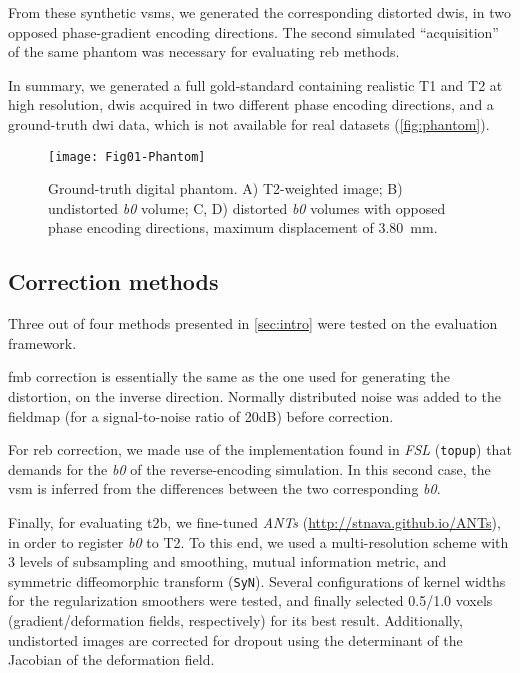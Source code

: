 From these synthetic \glspl*{vsm}, we generated
the corresponding distorted \glspl*{dwi}, in two opposed
phase-gradient encoding directions. The second simulated
``acquisition'' of the same phantom was necessary 
for evaluating \gls*{reb} methods.

In summary, we generated 
a full gold-standard containing realistic T1 and T2
at high resolution, \glspl*{dwi} acquired in two
different phase encoding directions, and a ground-truth
\gls*{dwi} data, which is not available for real datasets
(\autoref{fig:phantom}).


\begin{figure}[thpb]
   \centering
   \texttt{[image: Fig01-Phantom]}
   \caption{Ground-truth digital phantom.
   A) T2-weighted image; B) undistorted \textit{b0} volume;
   C, D) distorted \textit{b0} volumes with opposed phase 
   encoding directions, maximum displacement of 3.80~mm.}
   \label{fig:phantom}
\end{figure}

\subsection{Correction methods}
\label{sec:correction}
Three out of four methods presented in \autoref{sec:intro}
were tested on the evaluation framework. 

\Gls*{fmb} correction
is essentially the same as the one used for generating the 
distortion, on the inverse direction. Normally distributed 
noise was added to the fieldmap (for a signal-to-noise 
ratio of 20dB) before correction.

For \Gls*{reb} correction, we made use of the implementation found 
in \emph{FSL} (\texttt{topup})
that demands for the \textit{b0} of the reverse-encoding simulation.
In this second case, the \gls*{vsm} is inferred from the differences
between the two corresponding \textit{b0}.

Finally, for evaluating \Gls*{t2b},
we fine-tuned \emph{ANTs} (\url{http://stnava.github.io/ANTs}),
in order to register \textit{b0} to T2. To this end, we used a
multi-resolution scheme with 3 levels of subsampling and smoothing,
mutual information metric, and symmetric diffeomorphic transform 
(\texttt{SyN}). Several configurations of kernel widths for the 
regularization smoothers were tested, and finally selected 
0.5/1.0 voxels (gradient/deformation fields, respectively) 
for its best result. Additionally, undistorted images are 
corrected for dropout using the determinant
of the Jacobian of the deformation field.

